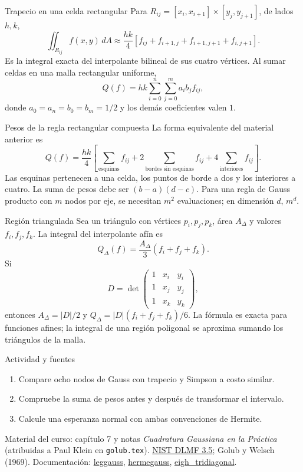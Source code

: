 \documentclass[aspectratio=169,12pt]{beamer}
\begin{document}
\begin{frame}{Trapecio en una celda rectangular}
Para $R_{ij}=[x_i,x_{i+1}]\times[y_j,y_{j+1}]$, de lados $h,k$,
\[\iint_{R_{ij}}f(x,y)\,dA\approx\frac{hk}{4}
[f_{ij}+f_{i+1,j}+f_{i+1,j+1}+f_{i,j+1}].\]
Es la integral exacta del interpolante bilineal de sus cuatro vértices.
Al sumar celdas en una malla rectangular uniforme,
\[Q(f)=hk\sum_{i=0}^n\sum_{j=0}^m a_i b_j f_{ij},\]
donde $a_0=a_n=b_0=b_m=1/2$ y los demás coeficientes valen $1$.
\end{frame}

\begin{frame}{Pesos de la regla rectangular compuesta}
La forma equivalente del material anterior es
\[Q(f)=\frac{hk}{4}\left[
\sum_{\text{esquinas}}f_{ij}+2\sum_{\text{bordes sin esquinas}}f_{ij}
+4\sum_{\text{interiores}}f_{ij}\right].\]
Las esquinas pertenecen a una celda, los puntos de borde a dos
y los interiores a cuatro.
La suma de pesos debe ser $(b-a)(d-c)$.
Para una regla de Gauss producto con $m$ nodos por eje, se necesitan $m^2$
evaluaciones; en dimensión $d$, $m^d$.
\end{frame}

\begin{frame}{Región triangulada}
Sea un triángulo con vértices $p_i,p_j,p_k$, área $A_\Delta$ y valores $f_i,f_j,f_k$.
La integral del interpolante afín es
\[Q_\Delta(f)=\frac{A_\Delta}{3}(f_i+f_j+f_k).\]
Si
\[D=\det\begin{pmatrix}1&x_i&y_i\\1&x_j&y_j\\1&x_k&y_k\end{pmatrix},\]
entonces $A_\Delta=|D|/2$ y $Q_\Delta=|D|(f_i+f_j+f_k)/6$.
La fórmula es exacta para funciones afines; la integral de una región poligonal
se aproxima sumando los triángulos de la malla.
\end{frame}

\begin{frame}{Actividad y fuentes}
\small
\begin{enumerate}
\item Compare ocho nodos de Gauss con trapecio y Simpson a costo similar.
\item Compruebe la suma de pesos antes y después de transformar el intervalo.
\item Calcule una esperanza normal con ambas convenciones de Hermite.
\end{enumerate}
\vfill
Material del curso: capítulo 7 y notas \textit{Cuadratura Gaussiana en la Práctica}
(atribuidas a Paul Klein en \texttt{golub.tex}).
\href{https://dlmf.nist.gov/3.5}{NIST DLMF 3.5}; Golub y Welsch (1969).
Documentación: \href{https://numpy.org/doc/stable/reference/generated/numpy.polynomial.legendre.leggauss.html}{leggauss},
\href{https://numpy.org/doc/stable/reference/generated/numpy.polynomial.hermite_e.hermegauss.html}{hermegauss},
\href{https://docs.scipy.org/doc/scipy/reference/generated/scipy.linalg.eigh_tridiagonal.html}{eigh\_tridiagonal}.
\end{frame}
\end{document}
